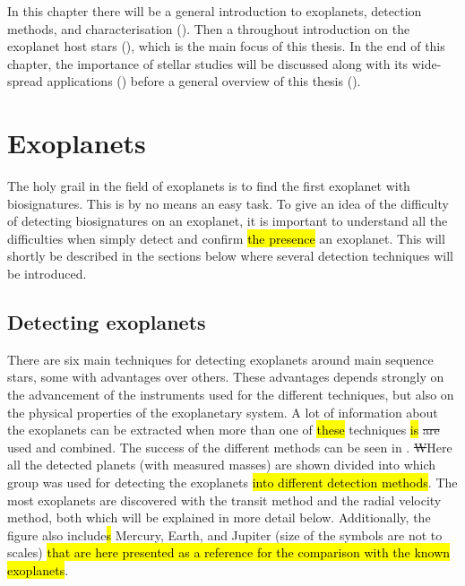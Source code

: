 In this chapter there will be a general introduction to exoplanets, detection methods, and
characterisation (). Then a throughout introduction on the exoplanet host stars
(), which is the main focus of this thesis. In the end of this chapter,
the importance of stellar studies will be discussed along with its wide-spread applications
() before a general overview of this thesis ().



\section{Exoplanets}
\label{sec:exoplanets}

The holy grail in the field of exoplanets is to find the first exoplanet with biosignatures. This is
by no means an easy task. To give an idea of the difficulty of detecting biosignatures on an
exoplanet, it is important to understand all the difficulties when simply detect and confirm \hl{the
presence} an exoplanet. This will shortly be described in the sections below where several detection
techniques will be introduced.

\subsection{Detecting exoplanets}
\label{sec:detecting_exoplanets}

There are six main techniques for detecting exoplanets around main sequence stars, some with
advantages over others. These advantages depends strongly on the advancement of the instruments used
for the different techniques, but also on the physical properties of the exoplanetary system. A lot
of information about the exoplanets can be extracted when more than one of \hl{these} techniques
\hl{is} \st{are} used and combined. The success of the different methods can be seen in
. \st{W}Here all the detected planets (with measured masses) are shown
divided {into which group was used for detecting the exoplanets} \hl{into different detection
methods}. The most exoplanets are discovered with the transit method and the radial velocity method,
both which will be explained in more detail below. Additionally, the figure also include\hl{s}
Mercury, Earth, and Jupiter (size of the symbols are not to scales) \hl{that are here presented as a
reference for the comparison with the known exoplanets}.

